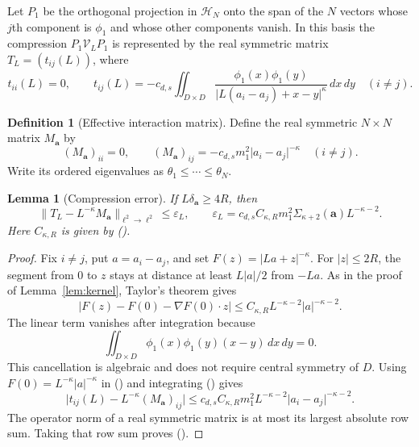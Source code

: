 \documentclass[twoside,10pt]{article}
\numberwithin{equation}{section}
\theoremstyle{slbody}
\newtheorem{lemma}[theorem]{Lemma}
\theoremstyle{definition}
\newtheorem{definition}[theorem]{Definition}
\newcommand{\norm}[1]{\lVert #1\rVert}
\newcommand{\abs}[1]{\lvert #1\rvert}
\renewcommand{\eqref}[1]{%
  \textup{{\normalfont(\oldstylenums{\ref{#1}}}\normalfont)}}
\begin{document}
Let $P_1$ be the orthogonal projection in $\mathcal H_N$ onto the span of
the $N$ vectors whose $j$th component is $\phi_1$ and whose other components
vanish.  In this basis the compression $P_1\mathcal V_LP_1$ is represented
by the real symmetric matrix $T_L=(t_{ij}(L))$, where
\begin{equation}\label{eq:exact-compression}
 t_{ii}(L)=0,
 \qquad
 t_{ij}(L)=-c_{d,s}\iint_{D\times D}
 \frac{\phi_1(x)\phi_1(y)}
 {\abs{L(a_i-a_j)+x-y}^{\kappa}}\,dx\,dy
 \quad(i\ne j).
\end{equation}

\begin{definition}[Effective interaction matrix]\label{def:effective-matrix}
Define the real symmetric $N\times N$ matrix $M_{\mathbf a}$ by
\begin{equation}\label{eq:effective-matrix}
 (M_{\mathbf a})_{ii}=0,
 \qquad
 (M_{\mathbf a})_{ij}
 =-c_{d,s}m_1^2\abs{a_i-a_j}^{-\kappa}
 \quad(i\ne j).
\end{equation}
Write its ordered eigenvalues as
$\theta_1\leq\cdots\leq\theta_N$.
\end{definition}

\begin{lemma}[Compression error]\label{lem:compression}
If $L\delta_{\mathbf a}\geq4R$, then
\begin{equation}\label{eq:compression-error}
 \norm{T_L-L^{-\kappa}M_{\mathbf a}}_{\ell^2\to\ell^2}
 \leq\varepsilon_L,
 \qquad
 \varepsilon_L
 =c_{d,s}C_{\kappa,R}m_1^2
 \Sigma_{\kappa+2}(\mathbf a)L^{-\kappa-2}.
\end{equation}
Here $C_{\kappa,R}$ is given by \eqref{eq:kernel-expansion}.
\end{lemma}

\begin{proof}
Fix $i\ne j$, put $a=a_i-a_j$, and set
$F(z)=\abs{La+z}^{-\kappa}$.  For $\abs z\leq2R$, the segment from $0$ to
$z$ stays at distance at least $L\abs a/2$ from $-La$.  As in the proof of
Lemma~\ref{lem:kernel}, Taylor's theorem gives
\begin{equation}\label{eq:multi-taylor}
 \abs{F(z)-F(0)-\nabla F(0)\mathbin{\cdot}z}
 \leq C_{\kappa,R}L^{-\kappa-2}\abs a^{-\kappa-2}.
\end{equation}
The linear term vanishes after integration because
\[
 \iint_{D\times D}\phi_1(x)\phi_1(y)(x-y)\,dx\,dy=0.
\]
This cancellation is algebraic and does not require central symmetry of
$D$.  Using $F(0)=L^{-\kappa}\abs a^{-\kappa}$ in
\eqref{eq:exact-compression} and integrating \eqref{eq:multi-taylor} gives
\[
 \abs{t_{ij}(L)-L^{-\kappa}(M_{\mathbf a})_{ij}}
 \leq c_{d,s}C_{\kappa,R}m_1^2
 L^{-\kappa-2}\abs{a_i-a_j}^{-\kappa-2}.
\]
The operator norm of a real symmetric matrix is at most its largest absolute
row sum.  Taking that row sum proves \eqref{eq:compression-error}.
\end{proof}
\end{document}
